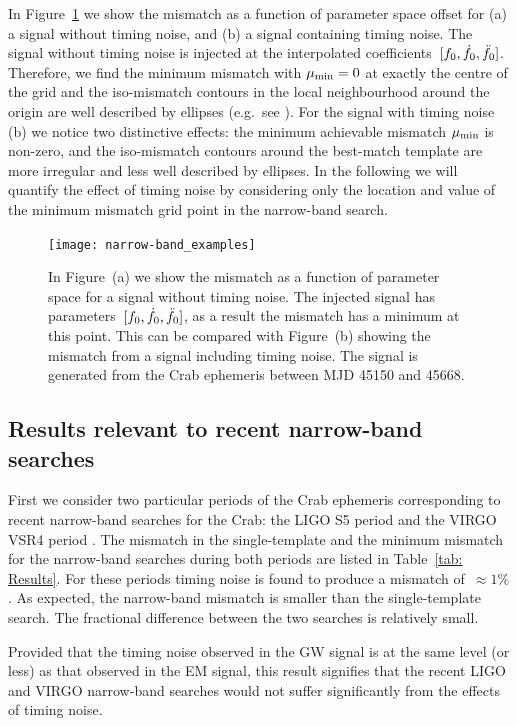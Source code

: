 \documentclass[../full_thesis/full_thesis.tex]{subfiles}
\begin{document}
In Figure~\ref{fig: narrow-band example} we show the mismatch as a function of
parameter space offset for (a) a signal without timing noise, and (b) a signal
containing timing noise. The signal without timing noise is injected at the
interpolated coefficients~$[f_{0}, \dot{f}_{0}, \ddot{f}_{0}]$.  Therefore, we find
the minimum mismatch with $\mu_{\mathrm{min}}=0$ at exactly the centre of the grid and the
iso-mismatch contours in the local neighbourhood around the origin are well
described by ellipses (e.g.\ see \citet{Prix2007}).  For the signal with timing
noise (b) we notice two distinctive effects: the minimum achievable mismatch
$\mu_{\mathrm{min}}$ is non-zero, and the iso-mismatch contours around the best-match
template are more irregular and less well described by ellipses.  In the
following we will quantify the effect of timing noise by considering only the
location and value of the minimum mismatch grid point in the narrow-band
search.
\begin{figure}[htb]
\centering
\texttt{[image: narrow-band\_examples]}
\caption{In Figure~(a) we show the mismatch as a function of parameter space
    for a signal without timing noise. The injected signal has
    parameters~$[f_{0}, \dot{f}_{0}, \ddot{f}_{0}]$, as a result the mismatch has
    a minimum at this point. This can be compared with Figure~(b) showing the
mismatch from a signal including timing noise. The signal is generated from the
Crab ephemeris between MJD 45150 and 45668.}
\label{fig: narrow-band example}
\end{figure}


\subsection{Results relevant to recent narrow-band searches}

First we consider two particular periods of the Crab ephemeris corresponding to
recent narrow-band searches for the Crab: the LIGO S5 period \citep{ligo2008}
and the VIRGO VSR4 period \citep{ligo2015}. The mismatch in the single-template
and the minimum mismatch for the narrow-band searches during both periods are
listed in Table~\ref{tab: Results}. For these periods timing noise is
found to produce a mismatch of~$\approx 1\%$. As expected, the narrow-band
mismatch is smaller than the single-template search. The fractional difference
between the two searches is relatively small.

Provided that the timing noise observed in the GW signal is at the same level
(or less) as that observed in the EM signal, this result signifies that the
recent LIGO and VIRGO narrow-band searches would not suffer significantly
from the effects of timing noise.
\end{document}
